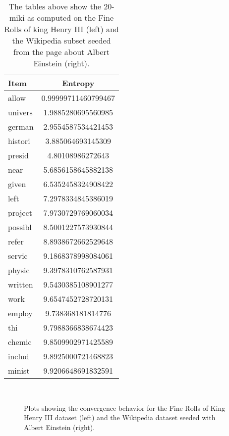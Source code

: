 \documentclass[paper=a4, fontsize=11pt]{scrartcl}
\begin{document}
\begin{table}
\begin{minipage}{.5\textwidth}
        \small
        \centering
    	\begin{tabular}{l S[round-precision=4]}
    		\toprule
    		{Item} & {Entropy}\\
    		\midrule
    		allow & 0.99999711460799467\\
    		univers & 1.9885280695560985\\
    		german & 2.9554587534421453\\
    		histori & 3.885064693145309\\
    		presid & 4.80108986272643\\
    		near & 5.6856158645882138\\
    		given & 6.5352458324908422\\
    		left & 7.2978334845386019\\
    		project & 7.9730729769060034\\
    		possibl & 8.5001227573930844\\
    		refer & 8.8938672662529648\\
    		servic & 9.1868378998084061\\
    		physic & 9.3978310762587931\\
    		written & 9.5430385108901277\\
    		work & 9.6547452728720131\\
    		employ & 9.738368181814776\\
    		thi & 9.7988366838674423\\
    		chemic & 9.8509902971425589\\
    		includ & 9.8925000721468823\\
    		minist & 9.9206648691832591\\
    		\bottomrule
    	\end{tabular}
    	\label{t:miki_wikipedia}
    \end{minipage}
    \caption{The tables above show the 20-miki as computed on the Fine Rolls of king Henry III (left) and the Wikipedia subset seeded from the page about Albert Einstein (right).}
\end{table}

\begin{figure}
    ~
    
    \caption{Plots showing the convergence behavior for the Fine Rolls of King Henry III dataset (left) and the Wikipedia dataset seeded with Albert Einstein (right).}\label{fig:1}
\end{figure}
\end{document}
